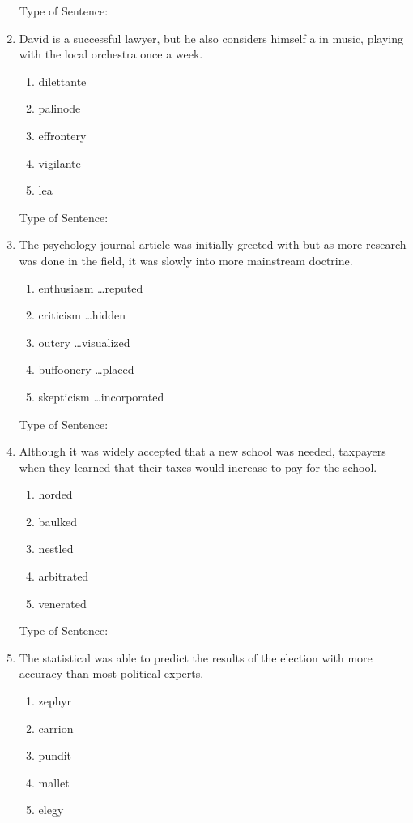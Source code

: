 \begin{enumerate}
Type of Sentence:\hrulefill

\bigskip
\item David is a successful lawyer, but he also considers himself a \longline in music, playing with the local orchestra once a week. 
\begin{enumerate}[label=(\Alph*)]
\item dilettante 
\item palinode
\item effrontery
\item vigilante 
\item lea
\end{enumerate}

Type of Sentence:\hrulefill

\bigskip
\item The psychology journal article was initially greeted with \longline but as more research was done in the field, it was slowly \longline into more mainstream doctrine.
\begin{enumerate}[label=(\Alph*)]
\item enthusiasm \ldots reputed
\item criticism \ldots hidden 
\item outcry \ldots visualized 
\item buffoonery \ldots placed
\item skepticism \ldots incorporated
\end{enumerate}

Type of Sentence:\hrulefill

\bigskip
\item Although it was widely accepted that a new school was needed, taxpayers \longline when they learned that their taxes would increase to pay for the school.
\begin{enumerate}[label=(\Alph*)]
\item horded 
\item baulked
\item nestled 
\item arbitrated 
\item venerated 
\end{enumerate}

Type of Sentence:\hrulefill

\bigskip
\item The statistical \longline was able to predict the results of the election with more accuracy than most political experts. 
\begin{enumerate}[label=(\Alph*)]
\item zephyr
\item carrion
\item pundit
\item mallet
\item elegy
\end{enumerate}


\end{enumerate}

